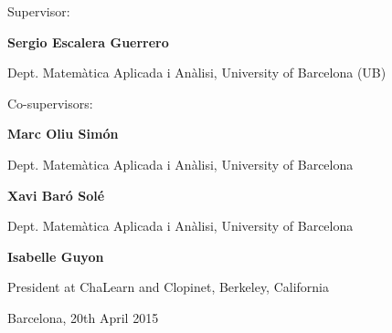 \begin{center}
{\large Supervisor:}


\medskip %

{\Large\bf Sergio Escalera Guerrero}

\medskip %

{Dept. Matemàtica Aplicada i Anàlisi, University of Barcelona (UB)}

\medskip



\bigskip %


{\large Co-supervisors:}


\begin{multicols}{3}	
\medskip %

{\Large\bf Marc Oliu Simón}

\medskip %

{Dept. Matemàtica Aplicada i Anàlisi, University of Barcelona}

\medskip %

{\Large\bf Xavi Baró Solé}

\medskip %

{Dept. Matemàtica Aplicada i Anàlisi, University of Barcelona}





{\Large\bf Isabelle Guyon}

\medskip %

{President at ChaLearn and Clopinet, Berkeley, California}


\end{multicols}

\medskip\medskip\medskip\medskip\medskip


{\Large Barcelona, 20th April 2015}
\end{center}


